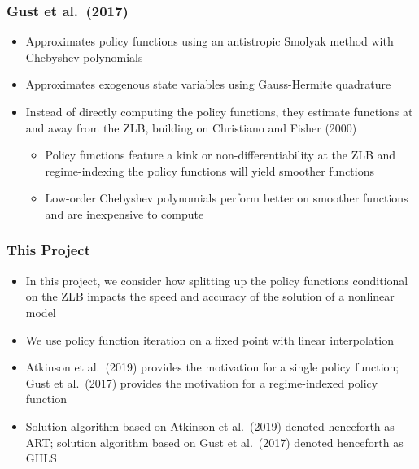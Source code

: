 \documentclass[11pt]{beamer}
\begin{document}
\begin{frame}\frametitle{Gust et al.\ (2017)}
\begin{itemize}\setlength{\itemsep}{6pt}
\item  Approximates policy functions using an antistropic Smolyak method with Chebyshev polynomials
\item  Approximates exogenous state variables using Gauss-Hermite quadrature%
\item  Instead of directly computing the policy functions, they estimate functions at and away from the ZLB, building on Christiano and Fisher (2000)
  \begin{itemize}\setlength{\itemsep}{4pt}
\item  Policy functions feature a kink or non-differentiability at the ZLB and regime-indexing the policy functions will yield smoother functions
\item  Low-order Chebyshev polynomials perform better on smoother functions and are inexpensive to compute
\end{itemize}
\end{itemize}
\end{frame}
\begin{frame}\frametitle{This Project}
\begin{itemize}\setlength{\itemsep}{8pt}
\item  In this project, we consider how splitting up the policy functions conditional on the ZLB impacts the speed and accuracy of the solution of a nonlinear model
\item  We use policy function iteration on a fixed point with linear interpolation
\item  Atkinson et al.\ (2019) provides the motivation for a single policy function;  Gust et al.\ (2017) provides the motivation for a regime-indexed policy function
\item  Solution algorithm based on Atkinson et al.\ (2019) denoted henceforth as ART; solution algorithm based on Gust et al.\ (2017) denoted henceforth as GHLS
\end{itemize}
\end{frame}
\end{document}
